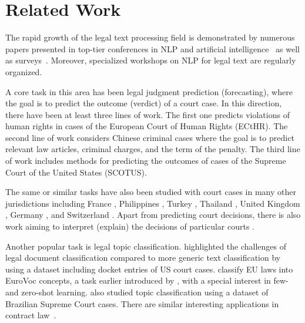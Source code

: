 \documentclass[11pt]{article}
\begin{document}
\section{Related Work}

The rapid growth of the legal text processing field is demonstrated by numerous papers presented in top-tier conferences in NLP and artificial intelligence~\cite{luo-etal-2017-learning,Zhong2018,chalkidis-etal-2019-neural,valvoda-etal-2021-precedent} as well as surveys~\cite{chalkidis2018deep,zhong2020does,bommarito2021Lex}. Moreover, specialized workshops on NLP for legal text \cite{aletras2019proceedings,di2020ieee,aletras2020proceedings} are regularly organized.

A core task in this area has been legal judgment prediction (forecasting), where the goal is to predict the outcome (verdict) of a court case. In this direction, there have been at least three lines of work. The first one \cite{aletras2016predicting,chalkidis-etal-2019-neural,medvedeva2020using,medvedeva2021automatic} predicts violations of human rights in cases of the European Court of Human Rights (ECtHR). The second line of work \cite{luo-etal-2017-learning, Zhong2018,yang-etal-2019-ljp} considers Chinese criminal cases where the goal is to predict relevant law articles, criminal charges, and the term of the penalty. 
The third line of work \cite{ruger2004supreme, katz2017general,kaufman_kraft_sen_2019} includes methods for predicting the outcomes of cases of the Supreme Court of the United States (SCOTUS). 

The same or similar tasks have also been studied with court cases in many other jurisdictions including France \cite{sulea_predicting_2017}, Philippines \cite{virtucio2018predicting}, Turkey \cite{mumcuouglu2021natural}, Thailand \cite{kowsrihawat2018predicting}, United Kingdom \cite{strickson2020legal}, Germany \cite{urchs_design_2021}, and Switzerland \cite{niklaus-etal-2021-swiss}. Apart from predicting court decisions, there is also work aiming to interpret (explain) the decisions of particular courts \cite{ye_interpretable_2018,chalkidis-et-al-2021-ecthr, branting2021scalable}.

Another popular task is legal topic classification. \citet{nallapati-manning-2008-legal}  highlighted the challenges of legal document classification compared to more generic text classification by using a dataset including docket entries of US court cases. \citet{chalkidis2020-lmtc} classify EU laws into EuroVoc concepts, a task earlier introduced by \citet{Mencia2007}, with a special interest in few- and zero-shot learning. \citet{luz-de-araujo-etal-2020-victor} also studied topic classification using a dataset of Brazilian Supreme Court cases. There are similar interesting applications in contract law~\cite{lippi-etal-2019-claudette,tuggener-etal-2020-ledgar}.
\end{document}
